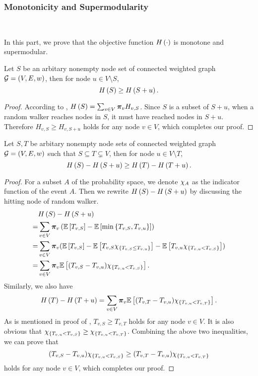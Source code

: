 \documentclass[sigconf]{acmart}
\begin{document}
\subsubsection{Monotonicity and Supermodularity}

\

In this part, we prove that the objective function \(H\left(\cdot\right)\) is monotone and supermodular.
\begin{theorem}[Monotonicity]\label{thm:mono}
    Let \(S\) be an arbitary nonempty node set of connected weighted graph \(\mathcal{G}=(V,E,w)\), then for node \(u\in V\setminus S\),
    \[H\left(S\right)\ge H\left(S+u\right).\]
\end{theorem}

\begin{proof}
    According to , \(H\left(S\right)=\sum_{v\in V}\boldsymbol{\pi}_vH_{v,S}\).
    Since \(S\) is a subset of \(S+u\), when a random walker reaches nodes in \(S\), it must have reached nodes in \(S+u\). Therefore \(H_{v,S}\ge H_{v,S+u}\) holds for any node \(v\in V\), which completes our proof.
\end{proof}

\begin{theorem}[Supermodularity]\label{thm:supermod}
    Let \(S,T\) be arbitary nonempty node sets of connected weighted graph \(\mathcal{G}=(V,E,w)\) such that \(S\subseteq T\subsetneq V\), then for node \(u\in V\setminus T\),
    \[H\left(S\right)-H\left(S+u\right)\ge H\left(T\right)-H\left(T+u\right).\]
\end{theorem}

\begin{proof}
    For a subset \(A\) of the probability space, we denote \(\chi_{A}\) as the indicator function of the event \(A\). Then we rewrite \(H\left(S\right)-H\left(S+u\right)\) by discussing the hitting node of random walker.
    \begin{align*}
          & H\left(S\right)-H\left(S+u\right)                                                                                                                      \\
        = & \sum_{v\in V}\boldsymbol{\pi}_v\left( \mathbb{E}\left[T_{v,S}\right]-\mathbb{E}\left[\min\left\{T_{v,S},T_{v,u} \right\}\right] \right)                                                           \\
        = & \sum_{v\in V}\boldsymbol{\pi}_v(\mathbb{E}\left[T_{v,S}\right]-\mathbb{E}\left[T_{v,S}\chi_{\left\{T_{v,S}\le T_{v,u} \right\}}\right]-\mathbb{E}\left[T_{v,u}\chi_{\left\{T_{v,u}<T_{v,S} \right\}}\right]) \\
        = & \sum_{v\in V}\boldsymbol{\pi}_v\mathbb{E}\left[(T_{v,S}-T_{v,u})\chi_{\left\{T_{v,u}<T_{v,S} \right\}}\right].
    \end{align*}
    Similarly, we also have
    \[H\left(T\right)-H\left(T+u\right)=\sum_{v\in V}\boldsymbol{\pi}_v\mathbb{E}\left[(T_{v,T}-T_{v,u})\chi_{\left\{T_{v,u}<T_{v,T} \right\}}\right].\]
    As is mentioned in proof of , \(T_{v,S}\ge T_{v,T}\) holds for any node \(v\in V\).
    It is also obvious that \(\chi_{\left\{T_{v,u}<T_{v,S} \right\}}\ge\chi_{\left\{T_{v,u}<T_{v,T} \right\}}\).
    Combining the above two inequalities, we can prove that
    \[(T_{v,S}-T_{v,u})\chi_{\left\{T_{v,u}<T_{v,S} \right\}}\ge(T_{v,T}-T_{v,u})\chi_{\left\{T_{v,u}<T_{v,T} \right\}}\]
    holds for any node \(v\in V\), which completes our proof.
\end{proof}
\end{document}

